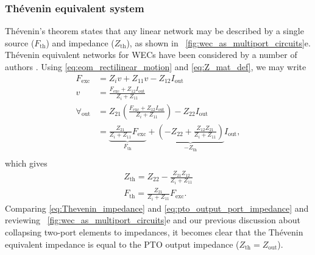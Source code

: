 \documentclass[lettersize,journal]{IEEEtran}
\begin{document}
\subsubsection{Th\'{e}venin equivalent system}\label{sec:thevenin_equivalent_system}
Th\'{e}venin's theorem \cite{Thevenin:1883aa} states that any linear network may be described by a single source ($F_{\textrm{th}}$) and impedance ($Z_{\textrm{th}}$), as shown in \figurename~\ref{fig:wec_as_multiport_circuits}e.
Th\'{e}venin equivalent networks for WECs have been considered by a number of authors \cite{Bacelli:2021aa,Blanco:2019aa,Bubbar:2018aa,Lewis:2013aa}.
Using \eqref{eq:eom_rectilinear_motion} and \eqref{eq:Z_mat_def}, we may write
%
\begin{equation}
        \nonumber
        \begin{split}
                F_{\textrm{exc}} &= Z_i v + Z_{11} v - Z_{12}I_{\textrm{out}} \\
                v &= \frac{F_{\textrm{exc}} + Z_{12}I_{\textrm{out}} }{Z_i + Z_{11}} \\[0.5em]
                \forall_{\textrm{out}}  &= Z_{21}\left(\frac{F_{\textrm{exc}} + Z_{12}I_{\textrm{out}} }{Z_i + Z_{11}}\right) - Z_{22}I_{\textrm{out}} \\
                &= \underbrace{\frac{Z_{21}}{Z_i + Z_{11}} F_\textrm{exc}}_{F_{\textrm{th}}} + \underbrace{\left( - Z_{22} + \frac{Z_{12}Z_{21}}{Z_i + Z_{11}}\right)}_{-Z_\textrm{th}} I_{\textrm{out}} , \\
        \end{split}
\end{equation}
%
which gives
%
\begin{subequations}
        \begin{gather}
                Z_{\textrm{th}} = Z_{22} - \frac{Z_{21} Z_{12}}{Z_{i} + Z_{11}} \label{eq:Thevenin_impedance} \\
                F_{\textrm{th}} = \frac{Z_{21}}{Z_i + Z_{11}}F_{\textrm{exc}} . \label{eq:Thevenin_force}
        \end{gather}
\end{subequations}
%
Comparing \eqref{eq:Thevenin_impedance} and \eqref{eq:pto_output_port_impedance} and reviewing \figurename~\ref{fig:wec_as_multiport_circuits}e and our previous discussion about collapsing two-port elements to impedances, it becomes clear that the Th\'{e}venin equivalent impedance is equal to the PTO output impedance ($Z_{\textrm{th}} = Z_{\textrm{out}}$).
\end{document}
